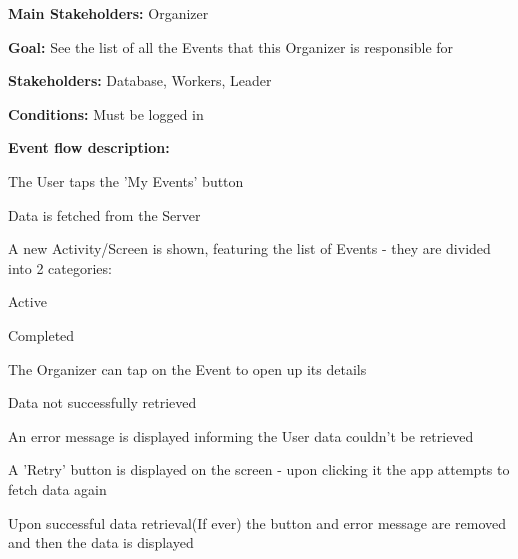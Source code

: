 			\noindent {}
			\begin{packed_item}
				\item \textbf{Main Stakeholders:} Organizer
				\item \textbf{Goal:} See the list of all the Events that this Organizer is responsible for
				\item \textbf{Stakeholders: } Database, Workers, Leader
				\item \textbf{Conditions: } Must be logged in
				\item \textbf{Event flow description: }
				\begin{packed_enum}
					\item The User taps the 'My Events' button
					\item Data is fetched from the Server
					\item A new Activity/Screen is shown, featuring the list of Events - they are divided into 2 categories:
					\item[] \begin{packed_enum}
						\item Active
						\item Completed
					\end{packed_enum}
					\item The Organizer can tap on the Event to open up its details
				\end{packed_enum}
				
				\begin{packed_item}
					\item[1.a, 3.a] Data not successfully retrieved
					\item[] \begin{packed_enum}
						\item An error message is displayed informing the User data couldn't be retrieved
						\item A 'Retry' button is displayed on the screen - upon clicking it the app attempts to fetch data again
						\item Upon successful data retrieval(If ever) the button and error message are removed and then the data is displayed
					\end{packed_enum}	
				\end{packed_item}
			\end{packed_item}
			
